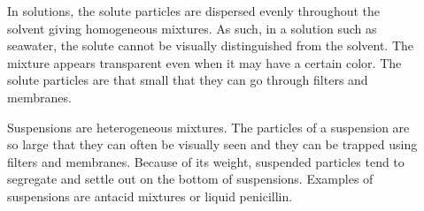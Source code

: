 \documentclass[main.tex]{subfiles}
\newcommand\chapterlabel{Ch-solutions}\setcounter{figurenewcounter}{0}\setcounter{tablenewcounter}{0}\setcounter{formulanewcounter}{0}
\begin{document}
\begin{description}
\item[] 
In solutions, the solute particles are dispersed evenly throughout the solvent giving homogeneous mixtures. As such, in a solution such as seawater, the solute cannot be visually distinguished from the solvent. The mixture appears transparent even when it may have a certain color. The solute particles are that small that they can go through filters and membranes.

\item[] Suspensions are heterogeneous mixtures. The particles of a suspension are so large that they can often be visually seen and they can be trapped using filters and membranes. Because of its weight, suspended particles tend to segregate and settle out on the bottom of suspensions. Examples of suspensions are antacid mixtures or liquid penicillin. 




     \label{Fig:{\chapterlabel}\thefigurenewcounter}
\hspace{-5cm}\vspace{-0.5cm}
\begin{minipage}[b]{1.\linewidth}
\begin{center}
\end{center}
\end{minipage}
\end{description}
\end{document}
